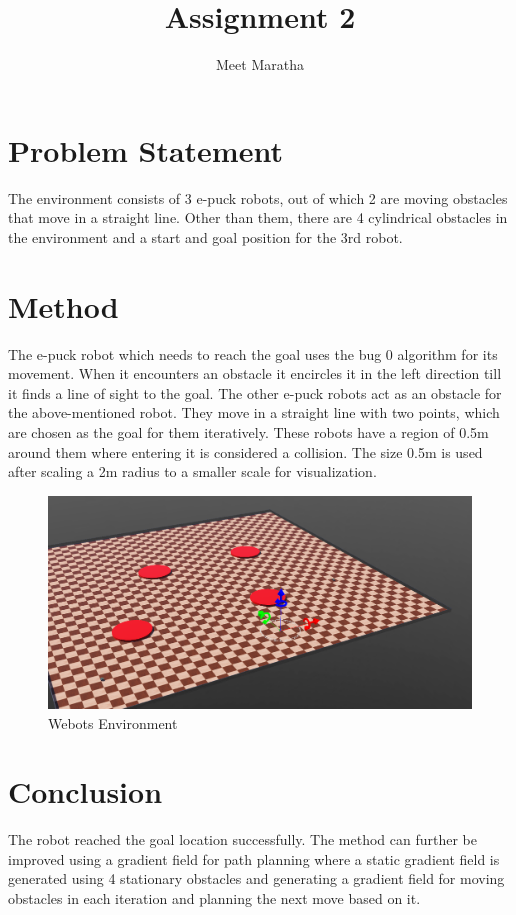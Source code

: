 \documentclass[12pt]{article}
\begin{document}
	\title{Assignment 2}
	\author{Meet Maratha}
	\maketitle
	\section{Problem Statement}
	The environment consists of 3 e-puck robots, out of which 2 are moving obstacles that move in a straight line. Other than them, there are 4 cylindrical obstacles in the environment and a start and goal position for the 3rd robot.
	\section{Method}
	The e-puck robot which needs to reach the goal uses the bug 0 algorithm for its movement. When it encounters an obstacle it encircles it in the left direction till it finds a line of sight to the goal. The other e-puck robots act as an obstacle for the above-mentioned robot. They move in a straight line with two points, which are chosen as the goal for them iteratively. These robots have a region of 0.5m around them where entering it is considered a collision. The size 0.5m is used after scaling a 2m radius to a smaller scale for visualization.
	\begin{figure}[h]
		\centering
		\includegraphics[scale=0.4]{images/Assignment 2.png}
		\caption{Webots Environment}
	\end{figure}
	
	\section{Conclusion}
	The robot reached the goal location successfully. The method can further be improved using a gradient field for path planning where a static gradient field is generated using 4 stationary obstacles and generating a gradient field for moving obstacles in each iteration and planning the next move based on it.
\end{document}
